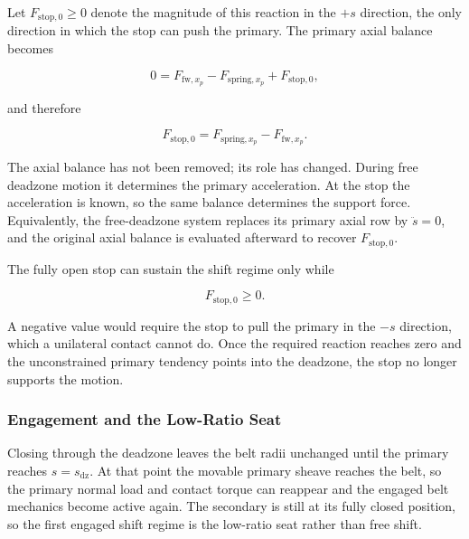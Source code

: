 \documentclass[11pt]{report}
\numberwithin{equation}{section}
\begin{document}
Let \(F_{\mathrm{stop},0}\geq0\) denote the magnitude of this reaction in the
\(+s\) direction, the only direction in which the stop can push the primary.
The primary axial balance becomes

\begin{equation}
    0
    =
    F_{\mathrm{fw},x_p}
    -
    F_{\mathrm{spring},x_p}
    +
    F_{\mathrm{stop},0},
    \label{eq:lower_stop_balance}
\end{equation}

and therefore

\begin{equation}
    F_{\mathrm{stop},0}
    =
    F_{\mathrm{spring},x_p}
    -
    F_{\mathrm{fw},x_p}.
    \label{eq:lower_stop_reaction}
\end{equation}

The axial balance has not been removed; its role has changed. During free
deadzone motion it determines the primary acceleration. At the stop the
acceleration is known, so the same balance determines the support force.
Equivalently, the free-deadzone system replaces its primary axial row by
\(\ddot s=0\), and the original axial balance is evaluated afterward to
recover \(F_{\mathrm{stop},0}\).

The fully open stop can sustain the shift regime only while

\begin{equation}
    F_{\mathrm{stop},0}\geq0.
    \label{eq:lower_stop_admissibility}
\end{equation}

A negative value would require the stop to pull the primary in the
\(-s\) direction, which a unilateral contact cannot do. Once the required
reaction reaches zero and the unconstrained primary tendency points into the
deadzone, the stop no longer supports the motion.

\subsubsection{Engagement and the Low-Ratio Seat}
\label{sec:low_ratio_supported_regime}

Closing through the deadzone leaves the belt radii unchanged until the primary
reaches \(s=s_{\mathrm{dz}}\). At that point the movable primary sheave reaches
the belt, so the primary normal load and contact torque can reappear and the
engaged belt mechanics become active again. The secondary is still at its
fully closed position, so the first engaged shift regime is the low-ratio
seat rather than free shift.
\end{document}
